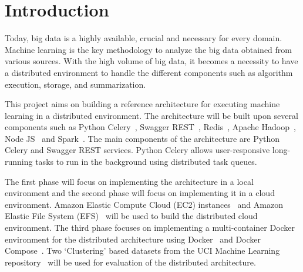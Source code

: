 

\maketitle

\section{Introduction}

Today, big data is a highly available, crucial and necessary for every domain. 
Machine learning is the key methodology to analyze the big data obtained from 
various sources. With the high volume of big data, it becomes a necessity to 
have a distributed environment to handle the different components such as 
algorithm execution, storage, and summarization. 

This project aims on building a reference architecture for executing 
machine learning in a distributed environment. The architecture will be built 
upon several components such as Python 
Celery~\cite{hid-sp18-416-www-python-celery}, Swagger 
REST~\cite{hid-sp18-416-www-swagger}, Redis~\cite{hid-sp18-416-www-redis}, 
Apache Hadoop~\cite{hid-sp18-416-www-apache-hadoop}, 
Node JS~\cite{hid-sp18-416-www-nodejs} and 
Spark~\cite{hid-sp18-416-www-apache-spark}. The main components of the 
architecture are Python Celery and Swagger REST services. Python Celery allows 
user-responsive long-running tasks to run in the background using distributed 
task queues. 

The first phase will focus on implementing the architecture in a local 
environment and the second phase will focus on implementing it in a cloud 
environment. Amazon Elastic Compute Cloud (EC2) 
instances~\cite{hid-sp18-416-www-amazon-ec2} and 
Amazon Elastic File System (EFS)~\cite{hid-sp18-416-www-amazon-efs} will be 
used to build the distributed cloud environment. The third 
phase focuses on implementing a multi-container Docker environment for the 
distributed architecture using Docker~\cite{hid-sp18-416-www-docker} and 
Docker Compose~\cite{hid-sp18-416-www-docker-compose}. Two `Clustering' based 
datasets from the UCI Machine Learning 
repository~\cite{hid-sp18-416-www-uci-ml-repository} will be used for 
evaluation of the distributed architecture. 

